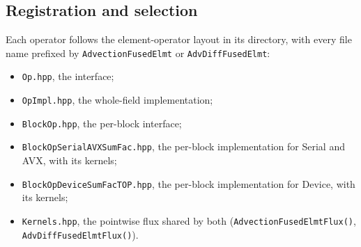 \subsection{Registration and selection}

Each operator follows the element-operator layout in its directory, with
every file name prefixed by \texttt{AdvectionFusedElmt} or
\texttt{AdvDiffFusedElmt}:
\begin{itemize}
  \item \texttt{Op.hpp}, the interface;
  \item \texttt{OpImpl.hpp}, the whole-field implementation;
  \item \texttt{BlockOp.hpp}, the per-block interface;
  \item \texttt{BlockOpSerialAVXSumFac.hpp}, the per-block implementation
    for Serial and AVX, with its kernels;
  \item \texttt{BlockOpDeviceSumFacTOP.hpp}, the per-block implementation
    for Device, with its kernels;
  \item \texttt{Kernels.hpp}, the pointwise flux shared by both
    (\texttt{AdvectionFusedElmtFlux()}, \texttt{AdvDiffFusedElmtFlux()}).
\end{itemize}

